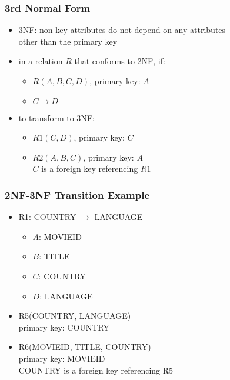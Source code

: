 \documentclass[dvipsnames]{beamer}
\begin{document}
\begin{frame}
  \frametitle{3rd Normal Form}

  \begin{itemize}
    \item \alert{3NF}: non-key attributes do not depend on any attributes\\
      other than the primary key

    \pause
    \medskip
    \item in a relation $R$ that conforms to 2NF, if:
    \begin{itemize}
      \item $R(A,B,C,D)$, primary key: $A$
      \item $C \rightarrow D$
    \end{itemize}

    \medskip
    \item to transform to 3NF:
    \begin{itemize}
      \item $R1(C,D)$, primary key: $C$
      \item $R2(A,B,C)$, primary key: $A$\\
        $C$ is a foreign key referencing $R1$
    \end{itemize}
  \end{itemize}
\end{frame}

\begin{frame}
  \frametitle{2NF-3NF Transition Example}

  \begin{itemize}
    \item R1: COUNTRY $\rightarrow$ LANGUAGE
    \begin{itemize}
      \item $A$: MOVIEID
      \item $B$: TITLE
      \item $C$: COUNTRY
      \item $D$: LANGUAGE
    \end{itemize}

    \pause
    \medskip
    \item R5(COUNTRY, LANGUAGE)\\
      primary key: COUNTRY

    \item R6(MOVIEID, TITLE, COUNTRY)\\
      primary key: MOVIEID\\
      COUNTRY is a foreign key referencing R5
  \end{itemize}
\end{frame}
\end{document}
